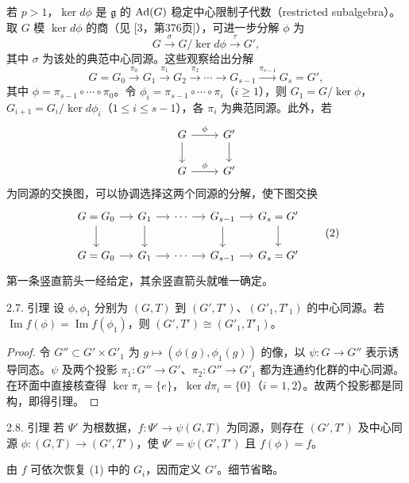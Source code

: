 若 $p>1$，$\ker d\phi$ 是 $\mathfrak g$ 的 $\operatorname{Ad}(G)$ 稳定中心限制子代数（restricted subalgebra）。取 $G$ 模 $\ker d\phi$ 的商（见 [3，第376页]），可进一步分解 $\phi$ 为
\[
 G\xrightarrow{\sigma}G/\ker d\phi\xrightarrow{\tau}G',
\]
其中 $\sigma$ 为该处的典范中心同源。这些观察给出分解
\begin{equation}
 G=G_0\xrightarrow{\pi_0}G_1\xrightarrow{\pi_1}G_2
 \xrightarrow{\pi_2}\cdots\longrightarrow G_{s-1}\xrightarrow{\pi_{s-1}}G_s=G',
 \tag{1}
\end{equation}
其中 $\phi=\pi_{s-1}\circ\cdots\circ\pi_0$。令 $\phi_i=\pi_{s-1}\circ\cdots\circ\pi_i$（$i\ge1$），则 $G_1=G/\ker\phi$，$G_{i+1}=G_i/\ker d\phi_i$（$1\le i\le s-1$），各 $\pi_i$ 为典范同源。此外，若
\[
 \begin{tikzcd}
 G\arrow[r,"\phi"]\arrow[d]&G'\arrow[d]\\
 \widetilde G\arrow[r,"\widetilde\phi"]&\widetilde G'
 \end{tikzcd}
\]
为同源的交换图，可以协调选择这两个同源的分解，使下图交换
\begin{equation}
 \begin{tikzcd}[column sep=small]
 G=G_0\arrow[r]\arrow[d]&G_1\arrow[r]\arrow[d]&\cdots\arrow[r]&G_{s-1}\arrow[r]\arrow[d]&G_s=G'\arrow[d]\\
 \widetilde G=\widetilde G_0\arrow[r]&\widetilde G_1\arrow[r]&\cdots\arrow[r]&\widetilde G_{s-1}\arrow[r]&\widetilde G_s=\widetilde G'
 \end{tikzcd}
 \tag{2}
\end{equation}
第一条竖直箭头一经给定，其余竖直箭头就唯一确定。
\begin{originaltheorem}{2.7. 引理}
设 $\phi,\phi_1$ 分别为 $(G,T)$ 到 $(G',T')$、$(G'_1,T'_1)$ 的中心同源。若 $\operatorname{Im}f(\phi)=\operatorname{Im}f(\phi_1)$，则 $(G',T')\cong(G'_1,T'_1)$。
\end{originaltheorem}
\begin{proof}
令 $G''\subset G'\times G'_1$ 为 $g\mapsto(\phi(g),\phi_1(g))$ 的像，以 $\psi:G\to G''$ 表示诱导同态。$\psi$ 及两个投影 $\pi_1:G''\to G'$、$\pi_2:G''\to G'_1$ 都为连通约化群的中心同源。在环面中直接核查得 $\ker\pi_i=\{e\}$，$\ker d\pi_i=\{0\}$（$i=1,2$）。故两个投影都是同构，即得引理。
\end{proof}
\begin{originaltheorem}{2.8. 引理}
若 $\Psi'$ 为根数据，$f:\Psi'\to\psi(G,T)$ 为同源，则存在 $(G',T')$ 及中心同源 $\phi:(G,T)\to(G',T')$，使 $\Psi'=\psi(G',T')$ 且 $f(\phi)=f$。
\end{originaltheorem}
由 $f$ 可依次恢复 (1) 中的 $G_i$，因而定义 $G'$。细节省略。
